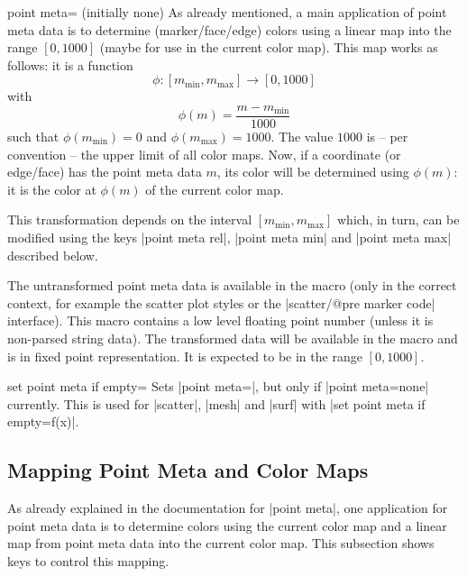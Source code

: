 \begin{pgfplotskey}{point meta= (initially none)%
}
    As already mentioned, a main application of point meta data is to determine
    (marker/face/edge) colors using a linear map into the range $[0,1000]$
    (maybe for use in the current color map). This map works as follows: it is
    a function
        \[ \phi\colon [m_{\min},m_{\max}] \to [0,1000] \]
    with
        \[ \phi(m) = \frac{m - m_{\min}} {1000} \]
    such that $\phi(m_{\min}) = 0$ and $\phi(m_{\max})=1000$. The value $1000$
    is -- per convention -- the upper limit of all color maps. Now, if a
    coordinate (or edge/face) has the point meta data $m$, its color will be
    determined using $\phi(m)$: it is the color at $\phi(m)$\textperthousand{}
    of the current color map.

    This transformation depends on the interval $[m_{\min},m_{\max}]$ which, in
    turn, can be modified using the keys |point meta rel|, |point meta min| and
    |point meta max| described below.

    The untransformed point meta data is available in the macro
    \declareandlabel{\pgfplotspointmeta} (only in the correct context, for
    example the scatter plot styles or the |scatter/@pre marker code|
    interface). This macro contains a low level floating point number (unless
    it is non-parsed string data). The transformed data will be available in
    the macro \declareandlabel{\pgfplotspointmetatransformed} and is in fixed
    point representation. It is expected to be in the range $[0,1000]$.

\end{pgfplotskey}

\begin{pgfplotskey}{set point meta if empty=}
    Sets |point meta=|, but only if |point meta=none|
    currently. This is used for |scatter|, |mesh| and |surf| with
    |set point meta if empty=f(x)|.
\end{pgfplotskey}


\subsection{Mapping Point Meta and Color Maps}

As already explained in the documentation for |point meta|, one application for
point meta data is to determine colors using the current color map and a linear
map from point meta data into the current color map. This subsection shows keys
to control this mapping.

